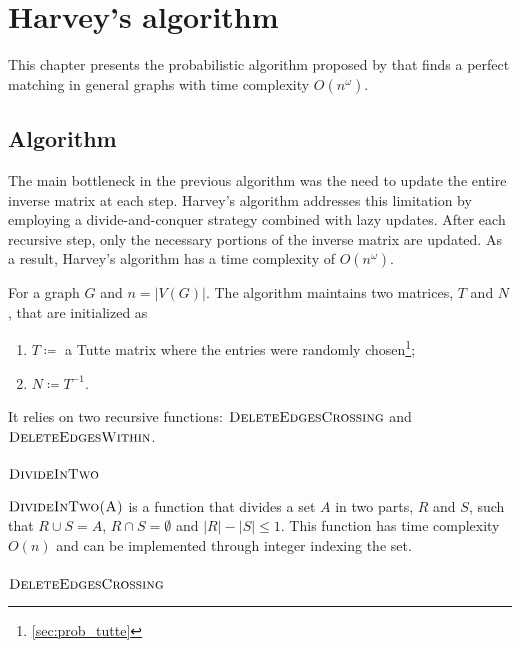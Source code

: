 \chapter{Harvey's algorithm}
\label{chap:harvey}

This chapter presents the probabilistic algorithm proposed by \citet{Harvey:Paper} that finds a perfect matching in general graphs with time complexity \(O(n^\omega)\).

\section{Algorithm}

The main bottleneck in the previous algorithm was the need to update the entire inverse matrix at each step. 
Harvey's algorithm addresses this limitation by employing a divide-and-conquer strategy combined with lazy updates. 
After each recursive step, only the necessary portions of the inverse matrix are updated.
As a result, Harvey's algorithm has a time complexity of \(O(n^\omega)\).

For a graph \(G\) and \(n = |V(G)|\). 
The algorithm maintains two matrices, \(T\) and \(N\), that are initialized as
\begin{enumerate}
    \item \(T \coloneqq \) a Tutte matrix where the entries were randomly chosen\footnote{\cref{sec:prob_tutte}};
    \item \(N \coloneqq T^{-1}\).
\end{enumerate}
It relies on two recursive functions: \(\textsc{DeleteEdgesCrossing}\) and \(\textsc{DeleteEdgesWithin}\). 

\subsection{\(\textsc{DivideInTwo}\)}
\(\textsc{DivideInTwo(A)}\) is a function that divides a set \(A\) in two parts, \(R\) and \(S\), such that \(R \cup S = A\), \(R \cap S = \emptyset\) and \(|R| - |S| \leq 1\).
This function has time complexity \(O(n)\) and can be implemented through integer indexing the set.

\subsection{\(\textsc{DeleteEdgesCrossing}\)}

